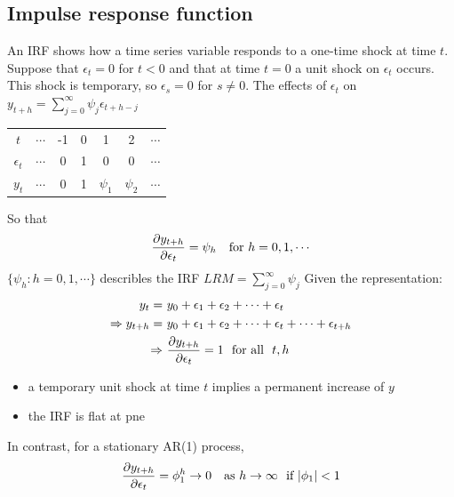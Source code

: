 \documentclass[a4paper,twoside,11pt]{article}
\begin{document}
\subsection{Impulse response function}
\noindent An IRF shows how a time series variable responds to a one-time shock at time $t$.
\newline
Suppose that $\epsilon_t =0$ for $t<0$ and that at time $t=0$ a unit shock on $\epsilon_t$ occurs. This shock is temporary, so $\epsilon_s=0$ for $s \ne 0$. The effects of $\epsilon_t$ on $y_{t+h} = \sum^\infty_{j=0} \psi_j \epsilon_{t+h-j}$
\begin{center}
\begin{tabular}{c c c c c c c} 
 \hline
$t$ & $\cdots$ & -1 & 0 & 1 & 2 & $\cdots$ \\ 
$\epsilon_t$ & $\cdots$ & 0 & 1 & 0 & 0 & $\cdots$ \\
$y_t$ & $\cdots$ & 0 & 1 & $\psi_1$ & $\psi_2$ & $\cdots$ \\
 \hline
\end{tabular}
\end{center}
So that 
\begin{equation*}
\begin{aligned}
\frac{\partial y_{t+h}}{\partial \epsilon_t} = \psi_h \ \ \ \textmd{for} \ h=0,1,\cdots
\end{aligned}
\end{equation*}
$\{\psi_h : h=0,1,\cdots \}$ describles the IRF 
\newline
$LRM=\sum^\infty_{j=0} \psi_j$
\newline
Given the representation: 
\begin{equation*}
\begin{aligned}
y_t =& \  y_0 + \epsilon_1 + \epsilon_2 + \cdots + \epsilon_t \\
\Rightarrow y_{t+h} =& \ y_0 + \epsilon_1 + \epsilon_2 + \cdots + \epsilon_t + \cdots + \epsilon_{t+h} \\
\Rightarrow & \ \frac{\partial y_{t+h}}{\partial \epsilon_t} = 1 \ \ \textmd{for all} \ \ t,h
\end{aligned}
\end{equation*}
\begin{itemize}
    \item a temporary unit shock at time $t$ implies a permanent increase of $y$ 
    \item the IRF is flat at pne
\end{itemize}
In contrast, for a stationary AR(1) process,
\begin{equation*}
\begin{aligned}
\frac{\partial y_{t+h}}{\partial \epsilon_t} = \phi_1^h \rightarrow 0 \ \  \ \textmd{as} \ h \rightarrow \infty \ \ \textmd{if} \ |\phi_1| <1
\end{aligned}
\end{equation*}
\end{document}
